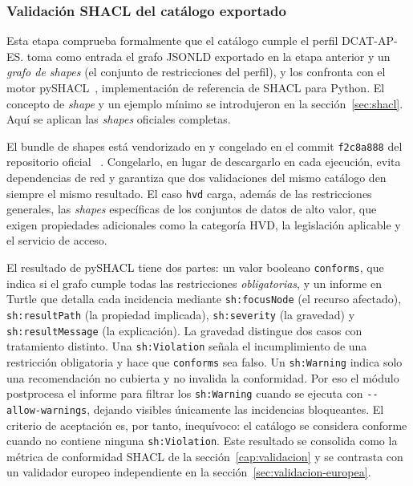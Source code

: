 \subsubsection{Validación SHACL del catálogo exportado}

Esta etapa comprueba formalmente que el catálogo cumple el perfil DCAT-AP-ES.  toma como entrada el grafo \ac{JSONLD} exportado en la etapa anterior y un \emph{grafo de shapes} (el conjunto de restricciones del perfil), y los confronta con el motor pySHACL~\cite{pyshacl}, implementación de referencia de \ac{SHACL} para Python. El concepto de \emph{shape} y un ejemplo mínimo se introdujeron en la sección~\ref{sec:shacl}. Aquí se aplican las \emph{shapes} oficiales completas.

El bundle de shapes está vendorizado en  y congelado en el commit \texttt{f2c8a888} del repositorio oficial ~\cite{datosGobValidacionDcatApEs2025}. Congelarlo, en lugar de descargarlo en cada ejecución, evita dependencias de red y garantiza que dos validaciones del mismo catálogo den siempre el mismo resultado. El caso \texttt{hvd} carga, además de las restricciones generales, las \emph{shapes} específicas de los conjuntos de datos de alto valor, que exigen propiedades adicionales como la categoría HVD, la legislación aplicable y el servicio de acceso.

El resultado de pySHACL tiene dos partes: un valor booleano \texttt{conforms}, que indica si el grafo cumple todas las restricciones \emph{obligatorias}, y un informe en Turtle que detalla cada incidencia mediante \texttt{sh:focusNode} (el recurso afectado), \texttt{sh:resultPath} (la propiedad implicada), \texttt{sh:severity} (la gravedad) y \texttt{sh:resultMessage} (la explicación). La gravedad distingue dos casos con tratamiento distinto. Una \texttt{sh:Violation} señala el incumplimiento de una restricción obligatoria y hace que \texttt{conforms} sea falso. Un \texttt{sh:Warning} indica solo una recomendación no cubierta y no invalida la conformidad. Por eso el módulo postprocesa el informe para filtrar los \texttt{sh:Warning} cuando se ejecuta con \texttt{-{}-allow-warnings}, dejando visibles únicamente las incidencias bloqueantes. El criterio de aceptación es, por tanto, inequívoco: el catálogo se considera conforme cuando no contiene ninguna \texttt{sh:Violation}. Este resultado se consolida como la métrica de conformidad SHACL de la sección~\ref{cap:validacion} y se contrasta con un validador europeo independiente en la sección~\ref{sec:validacion-europea}.

